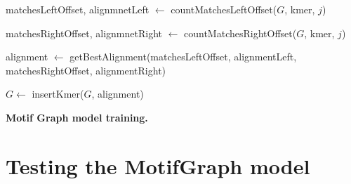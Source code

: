 \documentclass[a4paper, titlepage, openright]{book}
\newcommand{\motifgraph}{MotifGraph\xspace}
\begin{document}
\begin{algorithm}
	\DontPrintSemicolon
	
	{
	}

	{
		matchesLeftOffset, alignmnetLeft $\gets$ countMatchesLeftOffset($G$, kmer, $j$)
	}

	{
		matchesRightOffset, alignmnetRight $\gets$ countMatchesRightOffset($G$, kmer, $j$)
	}	
	
	alignment $\gets$ getBestAlignment(matchesLeftOffset, alignmentLeft, matchesRightOffset, alignmentRight)

	$G \gets$ insertKmer($G$, alignment)

	\caption{\textbf{Motif Graph model training.}}
	\label{algo:mt_mg}
\end{algorithm}
\section{ Testing the \motifgraph model}
\end{document}
